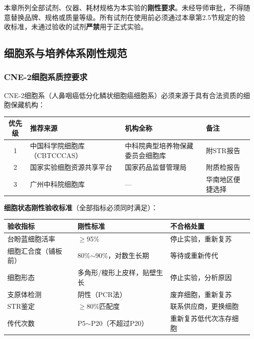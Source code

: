 \documentclass[12pt,a4paper]{article}
\begin{document}
\begin{warningbox}
本章所列全部试剂、仪器、耗材规格为本实验的\textbf{刚性要求}。未经导师审批，不得随意替换品牌、规格或质量等级。所有试剂在使用前必须通过本章第2.5节规定的验收标准，未通过验收的试剂\textbf{严禁}用于正式实验。
\end{warningbox}

\subsection{细胞系与培养体系刚性规范}

\subsubsection{CNE-2细胞系质控要求}

CNE-2细胞系（人鼻咽癌低分化鳞状细胞癌细胞系）必须来源于具有合法资质的细胞保藏机构：

\begin{center}
\begin{tabular}{clll}
\toprule
\textbf{优先级} & \textbf{推荐来源} & \textbf{机构全称} & \textbf{备注} \\
\midrule
1 & 中国科学院细胞库（CBTCCCAS）& 中科院典型培养物保藏委员会细胞库 & 附STR报告 \\
2 & 国家实验细胞资源共享平台 & 国家药品监督管理局 & 附质检报告 \\
3 & 广州中科院细胞库 & — & 华南地区便捷选择 \\
\bottomrule
\end{tabular}
\end{center}

\textbf{细胞状态刚性验收标准}（全部指标必须同时满足）：

\begin{center}
\begin{tabular}{llll}
\toprule
\rowcolor{tabheadbg}\color{white}\textbf{验收指标} & \color{white}\textbf{刚性标准} & \color{white}\textbf{不合格处置} \\
\midrule
台盼蓝细胞活率 & $\geq$95\% & 停止实验，重新复苏 \\
细胞汇合度（铺板前）& 80\%$\sim$90\%，对数生长期 & 等待或重新传代 \\
细胞形态 & 多角形/梭形上皮样，贴壁生长 & 停止实验，分析原因 \\
支原体检测 & 阴性（PCR法）& 废弃细胞，重新复苏 \\
STR鉴定 & $\geq$80\%匹配度 & 联系供应商，更换细胞 \\
传代次数 & P5$\sim$P20（不超过P20）& 重新复苏低代次冻存细胞 \\
\bottomrule
\end{tabular}
\end{center}
\end{document}
